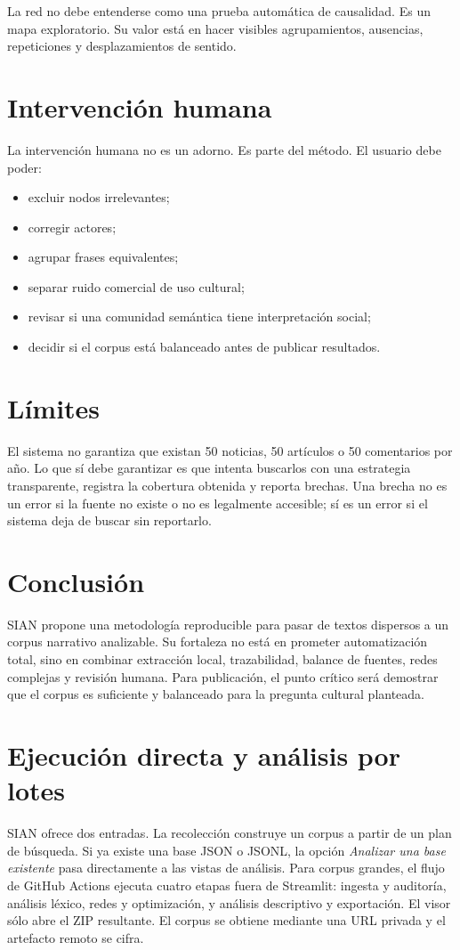 \documentclass[11pt]{article}
\begin{document}
La red no debe entenderse como una prueba automática de causalidad. Es un mapa exploratorio. Su valor está en hacer visibles agrupamientos, ausencias, repeticiones y desplazamientos de sentido.

\section{Intervención humana}

La intervención humana no es un adorno. Es parte del método. El usuario debe poder:

\begin{itemize}
    \item excluir nodos irrelevantes;
    \item corregir actores;
    \item agrupar frases equivalentes;
    \item separar ruido comercial de uso cultural;
    \item revisar si una comunidad semántica tiene interpretación social;
    \item decidir si el corpus está balanceado antes de publicar resultados.
\end{itemize}

\section{Límites}

El sistema no garantiza que existan 50 noticias, 50 artículos o 50 comentarios por año. Lo que sí debe garantizar es que intenta buscarlos con una estrategia transparente, registra la cobertura obtenida y reporta brechas. Una brecha no es un error si la fuente no existe o no es legalmente accesible; sí es un error si el sistema deja de buscar sin reportarlo.

\section{Conclusión}

SIAN propone una metodología reproducible para pasar de textos dispersos a un corpus narrativo analizable. Su fortaleza no está en prometer automatización total, sino en combinar extracción local, trazabilidad, balance de fuentes, redes complejas y revisión humana. Para publicación, el punto crítico será demostrar que el corpus es suficiente y balanceado para la pregunta cultural planteada.


\section{Ejecución directa y análisis por lotes}
SIAN ofrece dos entradas. La recolección construye un corpus a partir de un plan de búsqueda. Si ya existe una base JSON o JSONL, la opción \emph{Analizar una base existente} pasa directamente a las vistas de análisis. Para corpus grandes, el flujo de GitHub Actions ejecuta cuatro etapas fuera de Streamlit: ingesta y auditoría, análisis léxico, redes y optimización, y análisis descriptivo y exportación. El visor sólo abre el ZIP resultante. El corpus se obtiene mediante una URL privada y el artefacto remoto se cifra.
\end{document}
